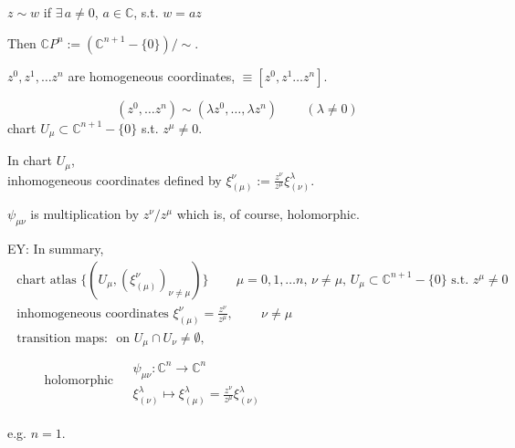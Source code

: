 \documentclass{book}
\begin{document}
$z\sim w$ if $\exists \, a \neq 0$, $a\in \mathbb{C}$, s.t. $w=az$

Then $\mathbb{C}P^n := (\mathbb{C}^{n+1} - \lbrace 0 \rbrace ) /\sim$.

$z^0, z^1, \dots z^n$ are homogeneous coordinates, $\equiv [ z^0, z^1 \dots z^n ]$.

\[
(z^0 , \dots z^n) \sim (\lambda z^0, \dots , \lambda z^n) \qquad \, (\lambda \neq 0)
\]
chart $U_{\mu} \subset \mathbb{C}^{n+1}-\lbrace 0 \rbrace$ s.t. $z^{\mu} \neq 0$.

In chart $U_{\mu}$, \\
inhomogeneous coordinates defined by $\xi^{\nu}_{ (\mu)} := \frac{z^{\nu}}{ z^{\mu} } \xi^{\lambda}_{ (\nu) }$.

$\psi_{ \mu \nu}$ is multiplication by $z^{\nu}/ z^{\mu}$ which is, of course, holomorphic.

EY: In summary, 
\begin{equation}
\begin{gathered}
  \text{ chart atlas } \lbrace (U_{\mu}, (\xi^{\nu}_{ (\mu) } )_{ \nu \neq \mu } ) \rbrace \qquad \, \mu = 0 , 1 , \dots n, \, \nu \neq \mu , \, U_{\mu} \subset \mathbb{C}^{n+1}- \lbrace 0 \rbrace \text{ s.t. } z^{\mu} \neq 0 \\
\text{ inhomogeneous coordinates } \xi_{ (\mu) }^{\nu} = \frac{ z^{\nu} }{ z^{\mu}} , \qquad \, \nu \neq \mu \\
\text{ transition maps: } \text{ on } U_{\mu} \cap U_{\nu} \neq \emptyset , \\
\qquad \, \text{ holomorphic } \begin{aligned} & \quad \\
  &  \psi_{\mu \nu} : \mathbb{C}^n \to \mathbb{C}^n \\
  & \xi^{\lambda}_{ (\nu  ) } \mapsto \xi^{\lambda}_{( \mu ) } = \frac{z^{\nu} }{ z^{\mu} } \xi^{\lambda}_{(\nu) }
  \end{aligned}
  \end{gathered}
\end{equation}


e.g. $n=1$.
\end{document}
